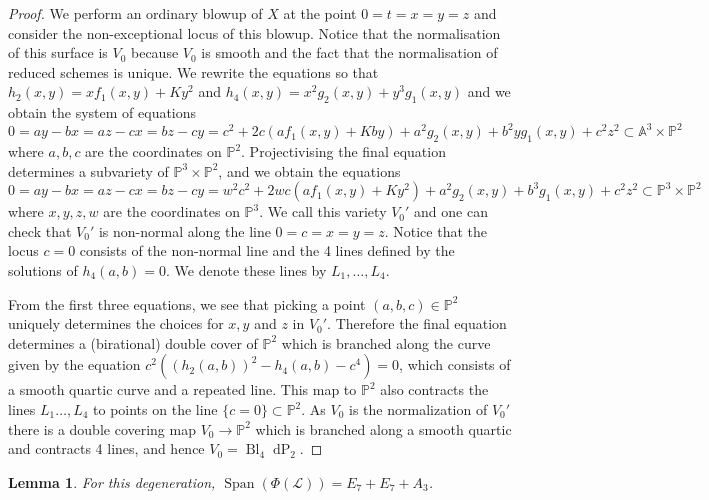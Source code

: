 \documentclass[a4paper]{amsart}
\theoremstyle{definition}
\theoremstyle{plain}
\newtheorem{lemma}[defn]{Lemma}
\theoremstyle{remark}
\newcommand{\PS}{\mathbb{P}}
\newcommand{\A}{\mathbb{A}}
\begin{document}
\begin{proof}
We perform an ordinary blowup of $X$ at the point $0=t=x=y=z$ and consider the non-exceptional locus of this blowup. Notice that the normalisation of this surface is $V_0$ because $V_0$ is smooth and the fact that the normalisation of reduced schemes is unique. We rewrite the equations so that $h_2(x,y) = xf_1(x,y)+Ky^2$ and $h_4(x,y) = x^2g_2(x,y)+y^3g_1(x,y)$ and we obtain the system of equations
$$0=ay-bx=az-cx=bz-cy=c^2+2c\left(af_1(x,y)+Kby\right)+a^2g_2(x,y)+b^2yg_1(x,y)+c^2z^2 \subset \A^3\times\PS^2$$
where $a,b,c$ are the coordinates on $\PS^2$. Projectivising the final equation determines a subvariety of $\PS^3 \times \PS^2$, and we obtain the equations
$$0=ay-bx=az-cx=bz-cy=w^2c^2+2wc\left(af_1(x,y)+Ky^2\right)+a^2g_2(x,y)+b^3g_1(x,y)+c^2z^2 \subset \PS^3\times\PS^2$$
where $x,y,z,w$ are the coordinates on $\PS^3$. We call this variety $V_0'$ and one can check that $V_0'$ is non-normal along the line $0=c=x=y=z$. Notice that the locus $c=0$ consists of the non-normal line and the 4 lines defined by the solutions of $h_4(a,b)=0$. We denote these lines by $L_1,\dots,L_4$.

From the first three equations, we see that picking a point $(a,b,c)\in\PS^2$ uniquely determines the choices for $x,y$ and $z$ in $V_0'$. Therefore the final equation determines a (birational) double cover of $\PS^2$ which is branched along the curve given by the equation $c^2\left((h_2(a,b))^2-h_4(a,b)-c^4\right)=0$, which consists of a smooth quartic curve and a repeated line. This map to $\PS^2$ also contracts the lines $L_1\dots,L_4$ to points on the line $\{c=0\}\subset\PS^2$. As $V_0$ is the normalization of $V_0'$ there is a double covering map $V_0\rightarrow\PS^2$ which is branched along a smooth quartic and contracts 4 lines, and hence $V_0=\operatorname{Bl}_4\operatorname{dP}_2$.
\end{proof}

\begin{lemma}\label{lemma: root lattice E7E7A3}
For this degeneration, $\operatorname{Span}(\Phi(\mathscr{L}))=E_7+E_7+A_3$.
\end{lemma}
\end{document}
